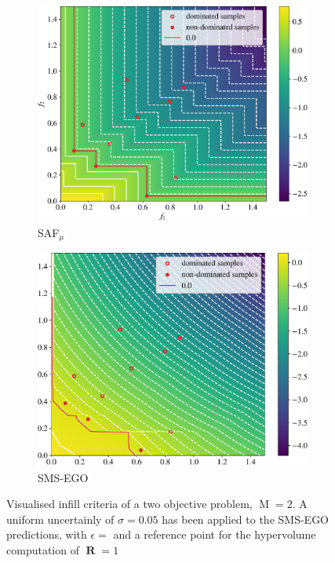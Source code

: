\documentclass[conference]{IEEEtran}
\DeclareMathOperator*{\nobj}{M}
\DeclareMathOperator*{\rp}{\mathbf{R}}
\newcommand\safmu{SAF$_{\mu}$\xspace}
\newcommand\smsego{SMS-EGO\xspace}
\begin{document}
\begin{figure}[t]
\begin{subfigure}[t]{0.45\columnwidth}
    \includegraphics[width=\columnwidth]{figures/_objective_space_SAF_mu.pdf}
    \caption{\safmu}
    \label{fig: saf_obj_space}
\end{subfigure}
\begin{subfigure}[t]{0.45\columnwidth}
    \includegraphics[width=\columnwidth]{figures/_objective_space_SMS_ei.pdf}
    \caption{\smsego}
    \label{fig: smsego_obj_space}
\end{subfigure}
\caption{Visualised infill criteria of a two objective problem, $\nobj=2$. A uniform uncertainly of $\sigma=0.05$ has been applied to the \smsego predictions, with $\epsilon=$ and a reference point for the hypervolume computation of $\rp=1$}
\label{fig: obj_space_comp}
\end{figure}
\end{document}
